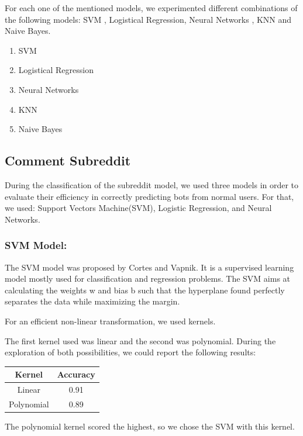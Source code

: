 \documentclass{article}
\begin{document}
    For each one of the mentioned models, we experimented different combinations of the following models: SVM , Logistical Regression, Neural Networks , KNN and Naive Bayes. 
        \begin{enumerate}
        \item SVM
        \item Logistical Regression
        \item Neural Networks
        \item KNN
        \item Naive Bayes
    \end{enumerate}

    \subsection{Comment Subreddit}
    During the classification of  the subreddit model, we used three models in order to evaluate their efficiency in correctly predicting bots from normal users. For that, we used: Support Vectors Machine(SVM), Logistic Regression, and Neural Networks.
    
    \subsubsection{SVM Model:}
    
    The SVM model was proposed by Cortes and Vapnik. It is a supervised learning model mostly used for classification and regression problems. The SVM aims at calculating the weights w and bias b such that the hyperplane found perfectly separates the data while maximizing the margin.
    
    For an efficient non-linear transformation, we used kernels.
    
    The first kernel used was linear and the second was polynomial. During the exploration of both possibilities, we could report the following results:
    
    \begin{center}
    \begin{tabular}{||c c||} 
     \hline
     Kernel & Accuracy    \\ [0.5ex] 
     \hline\hline
     Linear & 0.91  \\ 
     \hline
     Polynomial & 0.89  \\
     \hline
    \end{tabular}
    \end{center}
    
    The polynomial kernel scored the highest, so we chose the SVM with this kernel.
       
\end{document}
